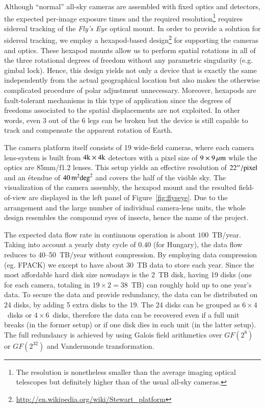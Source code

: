 \documentclass[11pt,twoside]{article}
\begin{document}
Although ``normal'' all-sky cameras are assembled with fixed optics and 
detectors, the expected per-image exposure times and the required 
resolution\footnote{The resolution is nonetheless smaller than the 
average imaging optical 
telescopes but definitely higher than of the usual all-sky cameras.} requires 
sidereal tracking of the {\it Fly's Eye} optical mount. In order to provide 
a solution for sidereal tracking, we employ a hexapod-based 
design\footnote{\url{http://en.wikipedia.org/wiki/Stewart_platform}} 
for supporting the cameras and optics. These hexapod mounts allow us 
to perform spatial rotations in all of the three rotational degrees
of freedom without any parametric singularity (e.g. gimbal lock). Hence,
this design yields not only a device that is exactly the same 
independently from the actual geographical location but also makes
the otherwise complicated procedure of polar adjustment unnecessary. 
Moreover, hexapods are fault-tolerant mechanisms in this type of application
since the degrees of freedoms associated to the spatial displacements
are not exploited. In other words, even 3 out of the 6 legs can be broken
but the device is still capable to track and compensate the apparent 
rotation of Earth. 

The camera platform itself consists of 19 wide-field cameras, where each
camera lens-system is built from $4{\rm k}\times 4{\rm k}$ detectors
with a pixel size of $9\times9\,{\rm\mu m}$ while the optics are 85mm/f1.2
lenses. This setup yields an effective resolution of $22''/{\rm pixel}$
and an \'etendue of $40\,{\rm m}^2{\rm deg}^2$ and covers the half of the
visible sky. The visualization
of the camera assembly, the hexapod mount and the resulted field-of-view
are displayed in the left panel of Figure~\ref{fig:flyseye}. 
Due to the arrangement
and the large number of individual camera-lens units, the whole design
resembles the compound eyes of insects, hence the name of the project.

The expected data flow rate in continuous operation is about $100$~TB/year.
Taking into account a yearly duty cycle of $0.40$ (for Hungary), the data flow reduces to 40--50~TB/year without compression.
By employing data compression (eg. FPACK) we except to have about 30~TB data to store each year.
Since the most affordable hard disk size nowadays is the 2~TB disk, having 19 disks (one for each camera, totaling in $19\times2=38$~TB) can roughly hold up to one year's data. To secure the data and provide redundancy, the data can be distributed on 24 disks, by adding 5 extra disks to the 19. The 24 disks can be grouped as $6\times4$~disks or $4\times6$~disks, therefore the data can be recovered even if a full unit breaks (in the former setup) or if one disk dies in each unit (in the latter setup). The full redundancy is achieved by using Galois field arithmetics over $GF(2^8)$ or $GF(2^{32})$ and Vandermonde transformation.
\end{document}
